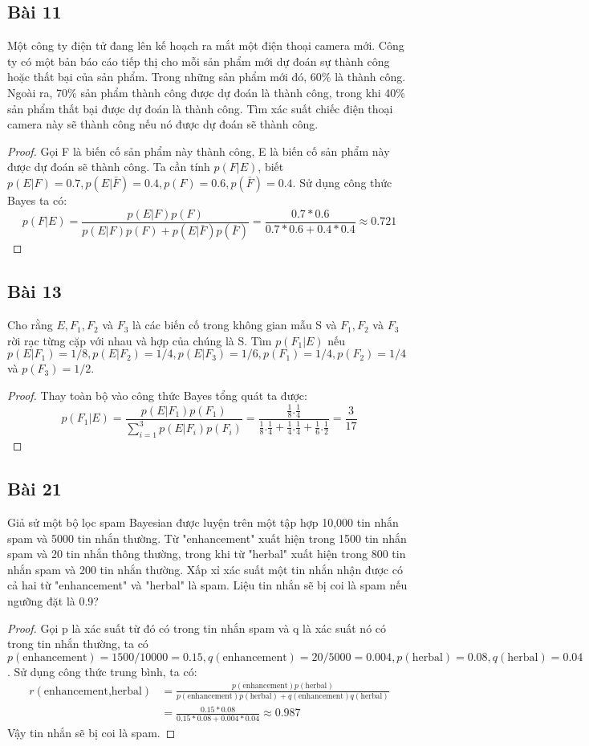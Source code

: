 \subsection*{Bài 11}
Một công ty điện tử đang lên kế hoạch ra mắt một điện thoại camera mới. Công ty có một bản báo cáo tiếp thị cho mỗi sản phẩm mới dự đoán sự thành công hoặc thất bại của sản phẩm. Trong những sản phẩm mới đó, 60\% là thành công. Ngoài ra, 70\% sản phẩm thành công được dự đoán là thành công, trong khi 40\% sản phẩm thất bại được dự đoán là thành công. Tìm xác suất chiếc điện thoại camera này sẽ thành công nếu nó được dự đoán sẽ thành công.
\begin{proof}
    Gọi F là biến cố sản phẩm này thành công, E là biến cố sản phẩm này được dự đoán sẽ thành công. Ta cần tính $p(F|E)$, biết $p(E|F)=0.7,p(E|\bar F)=0.4,p(F)=0.6,p(\bar F)=0.4$. Sử dụng công thức Bayes ta có:
    $$p(F|E)=\frac{p(E|F)p(F)}{p(E|F)p(F)+p(E|\bar F)p(\bar F)}=\frac{0.7*0.6}{0.7*0.6+0.4*0.4}\approx0.721$$
\end{proof}
\subsection*{Bài 13}
Cho rằng $E,F_1,F_2$ và $F_3$ là các biến cố trong không gian mẫu S và $F_1,F_2$ và $F_3$ rời rạc từng cặp với nhau và hợp của chúng là S. Tìm $p(F_1|E)$ nếu $p(E|F_1)=1/8,p(E|F_2)=1/4,p(E|F_3)=1/6,p(F_1)=1/4,p(F_2)=1/4$ và $p(F_3)=1/2$.
\begin{proof}
    Thay toàn bộ vào công thức Bayes tổng quát ta được:
    $$p(F_1|E)=\frac{p(E|F_1)p(F_1)}{\sum_{i=1}^{3}p(E|F_i)p(F_i)}=\frac{\frac{1}{8}.\frac{1}{4}}{\frac{1}{8}.\frac{1}{4}+\frac{1}{4}.\frac{1}{4}+\frac{1}{6}.\frac{1}{2}}=\frac{3}{17}$$
\end{proof}
\subsection*{Bài 21}
Giả sử một bộ lọc spam Bayesian được luyện trên một tập hợp 10,000 tin nhắn spam và 5000 tin nhắn thường. Từ "enhancement" xuất hiện trong 1500 tin nhắn spam và 20 tin nhắn thông thường, trong khi từ "herbal" xuất hiện trong 800 tin nhắn spam và 200 tin nhắn thường. Xấp xỉ xác suất một tin nhắn nhận được có cả hai từ "enhancement" và "herbal" là spam. Liệu tin nhắn sẽ bị coi là spam nếu ngưỡng đặt là 0.9?
\begin{proof}
    Gọi p là xác suất từ đó có trong tin nhắn spam và q là xác suất nó có trong tin nhắn thường, ta có $p(\text{enhancement})=1500/10000=0.15,q(\text{enhancement})=20/5000=0.004,p(\text{herbal})=0.08,q(\text{herbal})=0.04$. Sử dụng công thức trung bình, ta có:
    \begin{align*}
        r(\text{enhancement,herbal})&=\frac{p(\text{enhancement})p(\text{herbal})}{p(\text{enhancement})p(\text{herbal})+q(\text{enhancement})q(\text{herbal})}\\
        &=\frac{0.15*0.08}{0.15*0.08+0.004*0.04}\approx0.987
    \end{align*}
    Vậy tin nhắn sẽ bị coi là spam.
\end{proof}